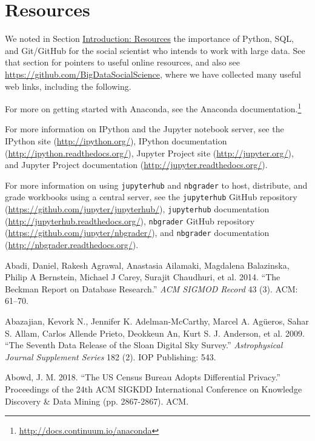 \documentclass[]{krantz}
\begin{document}
\section{Resources}\label{resources-7}

We noted in Section \protect\hyperlink{chap:intro}{Introduction:
Resources} the importance of Python, SQL, and Git/GitHub for the social
scientist who intends to work with large data. See that section for
pointers to useful online resources, and also see
\url{https://github.com/BigDataSocialScience}, where we have collected
many useful web links, including the following.

For more on getting started with Anaconda, see the Anaconda
documentation.\footnote{\url{http://docs.continuum.io/anaconda}}

For more information on IPython and the Jupyter notebook server, see the
IPython site (\url{http://ipython.org/}), IPython documentation
(\url{http://ipython.readthedocs.org/}), Jupyter Project site
(\url{http://jupyter.org/}), and Jupyter Project documentation
(\url{http://jupyter.readthedocs.org/}).

For more information on using \texttt{jupyterhub} and \texttt{nbgrader}
to host, distribute, and grade workbooks using a central server, see the
\texttt{jupyterhub} GitHub repository
(\url{https://github.com/jupyter/jupyterhub/}), \texttt{jupyterhub}
documentation (\url{http://jupyterhub.readthedocs.org/}),
\texttt{nbgrader} GitHub repository
(\url{https://github.com/jupyter/nbgrader/}), and \texttt{nbgrader}
documentation (\url{http://nbgrader.readthedocs.org/}).

\hypertarget{refs}{}
\hypertarget{ref-abadi2014beckman}{}
Abadi, Daniel, Rakesh Agrawal, Anastasia Ailamaki, Magdalena Balazinska,
Philip A Bernstein, Michael J Carey, Surajit Chaudhuri, et al. 2014.
``The Beckman Report on Database Research.'' \emph{ACM SIGMOD Record} 43
(3). ACM: 61--70.

\hypertarget{ref-abazajian2009seventh}{}
Abazajian, Kevork N., Jennifer K. Adelman-McCarthy, Marcel A. Agüeros,
Sahar S. Allam, Carlos Allende Prieto, Deokkeun An, Kurt S. J. Anderson,
et al. 2009. ``The Seventh Data Release of the Sloan Digital Sky
Survey.'' \emph{Astrophysical Journal Supplement Series} 182 (2). IOP
Publishing: 543.

\hypertarget{ref-abowed2018}{}
Abowd, J. M. 2018. ``The US Census Bureau Adopts Differential Privacy.''
Proceedings of the 24th ACM SIGKDD International Conference on Knowledge
Discovery \& Data Mining (pp. 2867-2867). ACM.
\end{document}
